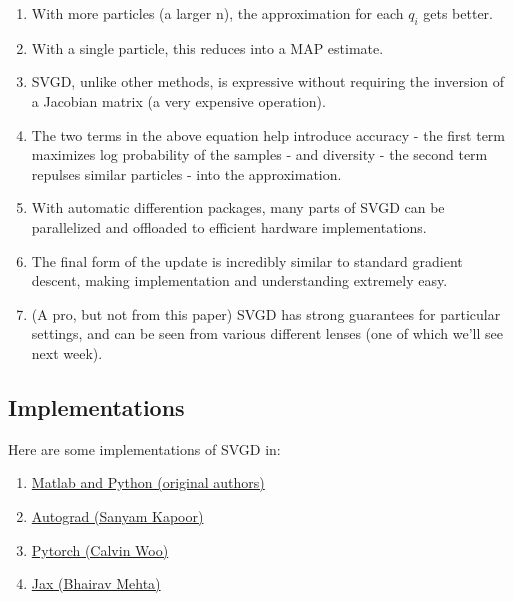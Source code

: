 \documentclass[12pt]{article}
\begin{document}
\begin{enumerate}
    \item With more particles (a larger  n), the approximation for each  $q_i$  gets better.
    \item With a single particle, this reduces into a MAP estimate.
    \item SVGD, unlike other methods, is expressive without requiring the inversion of a Jacobian matrix (a very expensive operation).
    \item The two terms in the above equation help introduce accuracy - the first term maximizes log probability of the samples - and diversity - the second term repulses similar particles - into the approximation.
    \item With automatic differention packages, many parts of SVGD can be parallelized and offloaded to efficient hardware implementations.
    \item The final form of the update is incredibly similar to standard gradient descent, making implementation and understanding extremely easy.
    \item (A pro, but not from this paper) SVGD has strong guarantees for particular settings, and can be seen from various different lenses (one of which we'll see next week).
\end{enumerate}

\subsection{Implementations}

Here are some implementations of SVGD in:

\begin{enumerate}
    \item \href{https://github.com/dilinwang820/Stein-Variational-Gradient-Descent}{Matlab and Python (original authors)}
    \item \href{https://github.com/activatedgeek/svgd}{Autograd (Sanyam Kapoor)}
    \item \href{https://github.com/calwoo/steins-method}{Pytorch (Calvin Woo)}
    \item \href{https://colab.research.google.com/drive/1ihKq85VQo3RBT-qaUl0D7gwLwlxB5VY7}{Jax (Bhairav Mehta)}
\end{enumerate}

%


\end{document}
